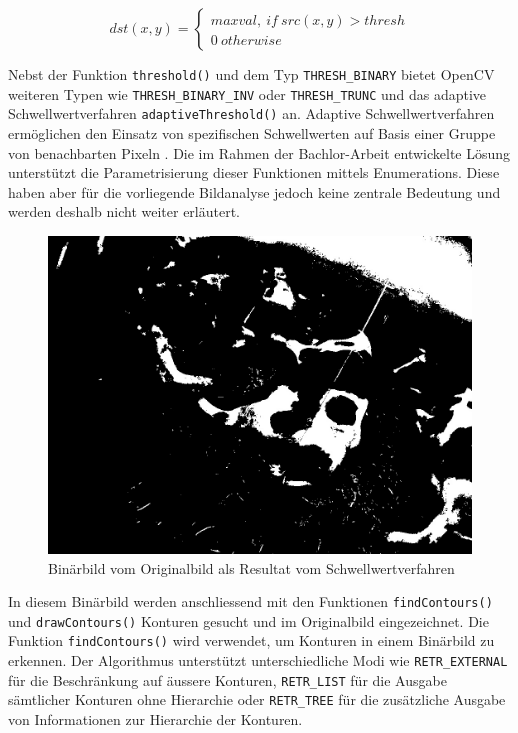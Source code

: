 \begin{equation}\label{Vollständige Linerarkombination zur Geburtsprognose: Schwellwertanalyse}
dst(x,y) =\begin{cases}
maxval,\: if \: src(x,y) > thresh\\
0\: otherwise
\end{cases}
\end{equation}

Nebst der Funktion \texttt{threshold()} und dem Typ \texttt{THRESH_BINARY} bietet OpenCV weiteren Typen wie \texttt{THRESH_BINARY_INV} oder \texttt{THRESH_TRUNC} und das adaptive Schwellwertverfahren \texttt{adaptiveThreshold()} an. Adaptive Schwellwertverfahren ermöglichen den Einsatz von spezifischen Schwellwerten auf Basis einer Gruppe von benachbarten Pixeln  \cite[S.342 f]{FernandezVillan2019}. Die im Rahmen der Bachlor-Arbeit entwickelte Lösung unterstützt die Parametrisierung dieser Funktionen mittels Enumerations. Diese haben aber für die vorliegende Bildanalyse jedoch keine zentrale Bedeutung und werden deshalb nicht weiter erläutert.

\begin{figure}[H]
	\center
	\includegraphics[scale=0.43]{Grafiken/entwicklung/8thresholdedMask.jpg}
	\caption{Binärbild vom Originalbild als Resultat vom Schwellwertverfahren} 
		\label{fig: Binärbild vom Originalbild als Resultat vom Schwellwertverfahren}
\end{figure}
		
In diesem Binärbild werden anschliessend mit den Funktionen \texttt{findContours()} und \texttt{drawContours()} Konturen gesucht und im Originalbild eingezeichnet. Die Funktion \texttt{findContours()} wird verwendet, um Konturen in einem Binärbild zu erkennen. Der Algorithmus unterstützt unterschiedliche Modi wie \texttt{RETR_EXTERNAL} für die Beschränkung auf äussere Konturen, \texttt{RETR_LIST} für die Ausgabe sämtlicher Konturen ohne Hierarchie oder \texttt{RETR_TREE} für die zusätzliche Ausgabe von Informationen zur Hierarchie der Konturen. 

